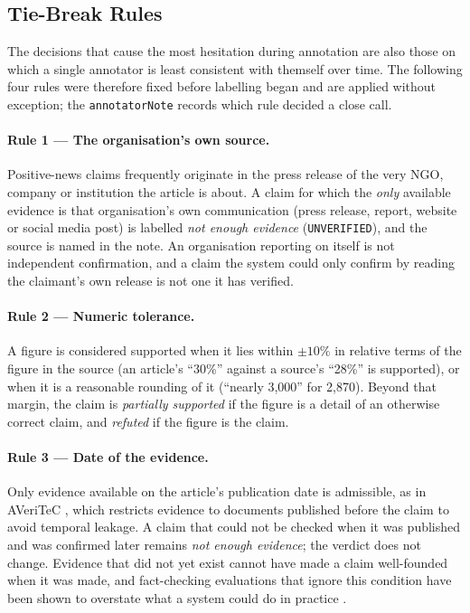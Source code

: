 
\subsection{Tie-Break Rules}
\label{subsec:custom-rules}

The decisions that cause the most hesitation during annotation are
also those on which a single annotator is least consistent with
themself over time. The following four rules were therefore fixed
before labelling began and are applied without exception; the
\texttt{annotatorNote} records which rule decided a close call.

\paragraph{Rule 1 --- The organisation's own source.}
Positive-news claims frequently originate in the press release of
the very NGO, company or institution the article is about. A claim
for which the \emph{only} available evidence is that organisation's
own communication (press release, report, website or social media
post) is labelled \emph{not enough evidence}
(\texttt{UNVERIFIED}), and the source is named in the note. An
organisation reporting on itself is not independent confirmation,
and a claim the system could only confirm by reading the claimant's
own release is not one it has verified.

\paragraph{Rule 2 --- Numeric tolerance.}
A figure is considered supported when it lies within $\pm10\%$ in
relative terms of the figure in the source (an article's ``30\%''
against a source's ``28\%'' is supported), or when it is a reasonable
rounding of it (``nearly 3,000'' for 2,870). Beyond that margin, the
claim is \emph{partially supported} if the figure is a detail of an
otherwise correct claim, and \emph{refuted} if the figure is the
claim.

\paragraph{Rule 3 --- Date of the evidence.}
Only evidence available on the article's publication date is
admissible, as in AVeriTeC \cite{schlichtkrull2023averitec}, which
restricts evidence to documents published before the claim to avoid
temporal leakage. A claim that could not be checked when it was
published and was confirmed later remains \emph{not enough evidence};
the verdict does not change. Evidence that did not yet exist cannot
have made a claim well-founded when it was made, and fact-checking
evaluations that ignore this condition have been shown to overstate
what a system could do in practice \cite{glockner2022missing}.

